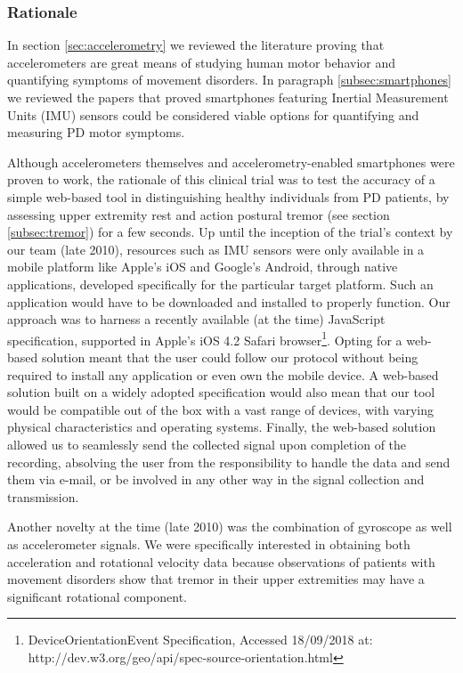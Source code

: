 \subsubsection{Rationale}
\label{subsubsec:smartCT1Rationale}
In section \ref{sec:accelerometry} we reviewed the literature proving that accelerometers are great means of studying human motor behavior and quantifying symptoms of movement disorders. In paragraph \ref{subsec:smartphones} we reviewed the papers that proved smartphones featuring Inertial Measurement Units (\gls{IMU}) sensors could be considered viable options for quantifying and measuring \gls{PD} motor symptoms.

Although accelerometers themselves and accelerometry-enabled smartphones were proven to work, the rationale of this clinical trial was to test the accuracy of a simple web-based tool in distinguishing healthy individuals from \gls{PD} patients, by assessing upper extremity rest and action postural tremor (see section \ref{subsec:tremor}) for a few seconds. Up until the inception of the trial's context by our team (late 2010), resources such as IMU sensors were only available in a mobile platform like Apple's iOS and Google's Android, through native applications, developed specifically for the particular target platform. Such an application would have to be downloaded and installed to properly function. Our approach was to harness a recently available (at the time) JavaScript specification, supported in Apple's iOS 4.2 Safari browser\footnote{DeviceOrientationEvent Specification, Accessed 18/09/2018 at: http://dev.w3.org/geo/api/spec-source-orientation.html}. Opting for a web-based solution meant that the user could follow our protocol without being required to install any application or even own the mobile device. A web-based solution built on a widely adopted specification would also mean that our tool would be compatible out of the box with a vast range of devices, with varying physical characteristics and operating systems. Finally, the web-based solution allowed us to seamlessly send the collected signal upon completion of the recording, absolving the user from the responsibility to handle the data and send them via e-mail, or be involved in any other way in the signal collection and transmission. 

Another novelty at the time (late 2010) was the combination of gyroscope as well as accelerometer signals. We were specifically interested in obtaining both acceleration and rotational velocity data because observations of patients with movement disorders show that tremor in their upper extremities may have a significant rotational component.

